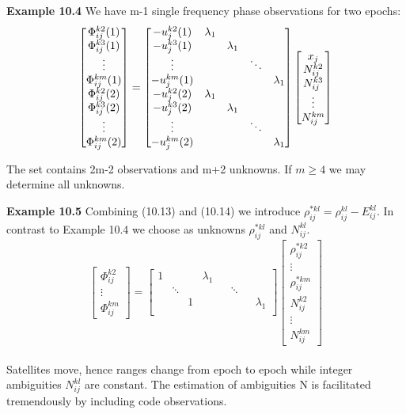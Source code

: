 \textbf{Example 10.4} We have m-1 single frequency phase observations for two epochs:
$$
\begin{bmatrix}
\Phi_{ij}^{k2}(1)\\
\Phi_{ij}^{k3}(1)\\
\vdots \\
\Phi_{ij}^{km}(1)\\
\Phi_{ij}^{k2}(2)\\
\Phi_{ij}^{k3}(2)\\
\vdots \\
\Phi_{ij}^{km}(2)
\end{bmatrix}
=\begin{bmatrix}
-u_{j}^{k2}(1)&\lambda_{1}\\
-u_{j}^{k3}(1)&           &\lambda_{1}\\
\vdots     &           &  &\ddots\\
-u_{j}^{km}(1) & &\multicolumn{2}{c}{\raisebox{1.3ex}[0pt]{\Huge}} & \lambda_{1}\\
-u_{j}^{k2}(2)&\lambda_{1}\\
-u_{j}^{k3}(2)&           &\lambda_{1}\\
\vdots     &           &  &\ddots\\
-u_{j}^{km}(2) & &\multicolumn{2}{c}{\raisebox{1.3ex}[0pt]{\Huge}} & \lambda_{1}
\end{bmatrix}
\begin{bmatrix}
x_{j}\\
N_{ij}^{k2}\\
N_{ij}^{k3}\\
\vdots\\
N_{ij}^{km}
\end{bmatrix}
$$

The set contains 2m-2 observations and m+2 unknowns. If $m \geq 4$ we may determine all unknowns.

\textbf{Example 10.5} Combining (10.13) and (10.14) we introduce $\rho_{ij}^{*kl}=\rho_{ij}^{kl}-E_{ij}^{kl}$. In contrast to Example 10.4 we choose as unknowns $\rho_{ij}^{*kl}$ and $N_{ij}^{kl}$.
$$
\begin{bmatrix}
\Phi_{ij}^{k2}\\
\vdots \\
\Phi_{ij}^{km}
\end{bmatrix}
=\begin{bmatrix}
1&&& \lambda_{1}\\
& \ddots &&&& \ddots\\
& & 1 & & &&&\lambda_{1}\\
\end{bmatrix}
\begin{bmatrix}
\rho_{ij}^{*k2}\\
\vdots\\
\rho_{ij}^{*km}\\
N_{ij}^{k2}\\
\vdots\\
N_{ij}^{km}
\end{bmatrix}
$$\\
Satellites move, hence ranges change from epoch to epoch while integer ambiguities $N_{ij}^{kl}$ are constant. The estimation of ambiguities N is facilitated tremendously by including code observations.

